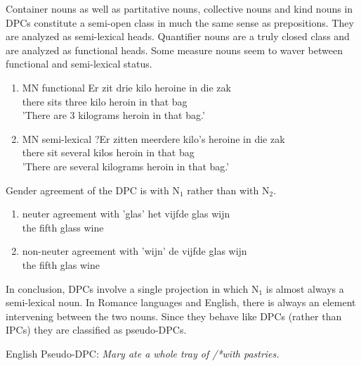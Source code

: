 \documentclass{article}
\begin{document}
 
 Container nouns as well as partitative nouns, collective nouns and kind nouns in DPCs constitute a semi-open class in much the same sense as prepositions. They are analyzed as semi-lexical heads. Quantifier nouns are a truly closed class and are analyzed as functional heads. Some measure nouns seem to waver between functional and semi-lexical status.
 
 
 \begin{example}
\label{}
 \begin{enumerate}
 \item MN functional
  \gll Er zit drie kilo heroine in die zak\\
  there sits three kilo heroin in that bag\\
  'There are 3 kilograms heroin in that bag.'
  \item MN semi-lexical
  \gll ?Er zitten meerdere kilo's heroine in die zak\\
  there sit several kilos heroin in that bag\\
  'There are several kilograms heroin in that bag.'
  \end{enumerate}

   \glt
   \glend
   \end{example}
 Gender agreement of the DPC is with N$_{1}$ rather than with N$_{2}$. 
 
 \begin{example}
\label{}
 \begin{enumerate}
 \item neuter agreement with 'glas'
  \gll het vijfde glas wijn\\
  the fifth glass wine\\
  \item non-neuter agreement with 'wijn'
  \gll *de vijfde glas wijn\\
  the fifth glas wine\\

   \glt
   \glend
  \end{enumerate}
   \end{example}
 
 In conclusion, DPCs involve a single projection in which N$_{1}$ is almost always a semi-lexical noun. 
 In Romance languages and English, there is always an element intervening between the two nouns. Since they behave like DPCs (rather than IPCs) they are classified as pseudo-DPCs.
 
 \begin{example}
\label{}
English Pseudo-DPC: 
  \textit{Mary ate a whole tray of /*with pastries.}

   \glt
   \glend
   \end{example}
\end{document}
